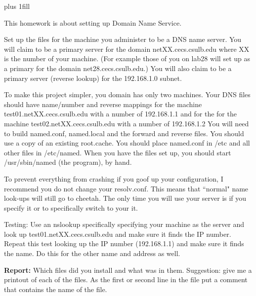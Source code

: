 
\rightskip=0pt plus 1fill

\parindent 0pt

This homework is about setting up Domain Name Service.

Set up the files for the machine you administer
to be a DNS name server. 
You will claim to be a primary server for the domain netXX.cecs.csulb.edu 
where XX is the number of your machine.
(For example those of you on lab28 will set up as a primary
for the domain net28.cecs.csulb.edu.)
You will also claim to be a primary
server (reverse lookup) for the 192.168.1.0 subnet.

To make this project simpler, you domain has only two machines.
Your DNS files should have name/number and reverse mappings
for the machine {\ltt{}test01.netXX.cecs.csulb.edu} 
with a number of {\ltt{}192.168.1.1}
and for the 
for the machine {\ltt{}test02.netXX.cecs.csulb.edu} 
with a number of {\ltt{}192.168.1.2}
You will need to build {\ltt{}named.conf},
{\ltt{}named.local} and the forward and reverse files.
You should use a copy of an existing {\ltt{}root.cache}.
You should place {\ltt{}named.conf} in {\ltt{}/etc}
and all other files in {\ltt{}/etc/named}.
When you have the files set up, you should start {\ltt{}/usr/sbin/named} 
(the program), by hand.

To prevent everything from crashing if you goof up your configuration,
I recommend you do not change your {\ltt{}resolv.conf}.
This means that ``normal" name look-ups will still go to {\ltt{}cheetah}.
The only time you will use your server is if you specify it or
to specifically switch to your it.

Testing: Use an {\ltt{}nslookup} specifically specifying your machine as 
the server and look up {\ltt{}test01.netXX.cecs.csulb.edu} and make sure
it finds the IP number.
Repeat this test looking up the IP number ({\ltt{}192.168.1.1})
and make sure it finds the name.
Do this for the other name and address as well.

{\bf Report:} Which files did you install and what was in them.
Suggestion: give me a printout of each of the files. As the first or second
line in the file put a comment that contains the name of the file.

\bye
